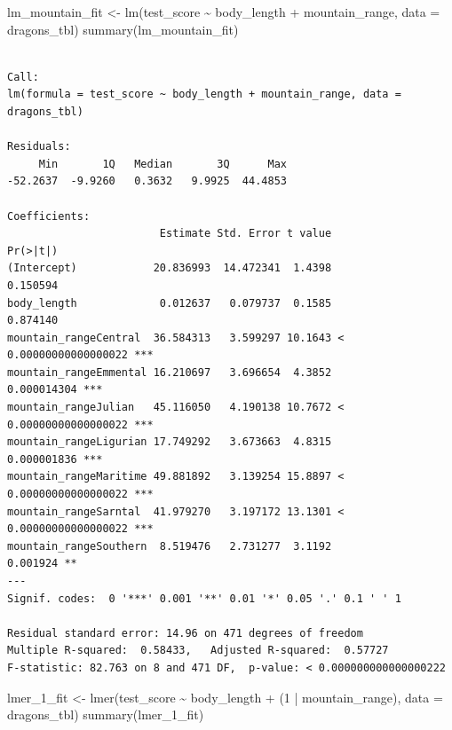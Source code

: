 \documentclass[
  letterpaper,
  DIV=11,
  oneside]{scrreport}
\newenvironment{Shaded}{\begin{snugshade}}{\end{snugshade}}
\newcommand{\AttributeTok}[1]{\textcolor[rgb]{0.40,0.45,0.13}{#1}}
\newcommand{\DecValTok}[1]{\textcolor[rgb]{0.68,0.00,0.00}{#1}}
\newcommand{\FunctionTok}[1]{\textcolor[rgb]{0.28,0.35,0.67}{#1}}
\newcommand{\NormalTok}[1]{\textcolor[rgb]{0.00,0.23,0.31}{#1}}
\newcommand{\OtherTok}[1]{\textcolor[rgb]{0.00,0.23,0.31}{#1}}
\newcommand{\SpecialCharTok}[1]{\textcolor[rgb]{0.37,0.37,0.37}{#1}}
\begin{document}
\begin{Shaded}
\begin{Highlighting}[]
\NormalTok{lm\_mountain\_fit }\OtherTok{\textless{}{-}} \FunctionTok{lm}\NormalTok{(test\_score }\SpecialCharTok{\textasciitilde{}}\NormalTok{ body\_length }\SpecialCharTok{+}\NormalTok{ mountain\_range, }\AttributeTok{data =}\NormalTok{ dragons\_tbl)}
\FunctionTok{summary}\NormalTok{(lm\_mountain\_fit)}
\end{Highlighting}
\end{Shaded}

\begin{verbatim}

Call:
lm(formula = test_score ~ body_length + mountain_range, data = dragons_tbl)

Residuals:
     Min       1Q   Median       3Q      Max 
-52.2637  -9.9260   0.3632   9.9925  44.4853 

Coefficients:
                        Estimate Std. Error t value              Pr(>|t|)    
(Intercept)            20.836993  14.472341  1.4398              0.150594    
body_length             0.012637   0.079737  0.1585              0.874140    
mountain_rangeCentral  36.584313   3.599297 10.1643 < 0.00000000000000022 ***
mountain_rangeEmmental 16.210697   3.696654  4.3852           0.000014304 ***
mountain_rangeJulian   45.116050   4.190138 10.7672 < 0.00000000000000022 ***
mountain_rangeLigurian 17.749292   3.673663  4.8315           0.000001836 ***
mountain_rangeMaritime 49.881892   3.139254 15.8897 < 0.00000000000000022 ***
mountain_rangeSarntal  41.979270   3.197172 13.1301 < 0.00000000000000022 ***
mountain_rangeSouthern  8.519476   2.731277  3.1192              0.001924 ** 
---
Signif. codes:  0 '***' 0.001 '**' 0.01 '*' 0.05 '.' 0.1 ' ' 1

Residual standard error: 14.96 on 471 degrees of freedom
Multiple R-squared:  0.58433,   Adjusted R-squared:  0.57727 
F-statistic: 82.763 on 8 and 471 DF,  p-value: < 0.000000000000000222
\end{verbatim}

\begin{Shaded}
\begin{Highlighting}[]
\NormalTok{lmer\_1\_fit }\OtherTok{\textless{}{-}} \FunctionTok{lmer}\NormalTok{(test\_score }\SpecialCharTok{\textasciitilde{}}\NormalTok{ body\_length }\SpecialCharTok{+}\NormalTok{ (}\DecValTok{1} \SpecialCharTok{|}\NormalTok{ mountain\_range), }\AttributeTok{data =}\NormalTok{ dragons\_tbl)}
\FunctionTok{summary}\NormalTok{(lmer\_1\_fit)}
\end{Highlighting}
\end{Shaded}
\end{document}
